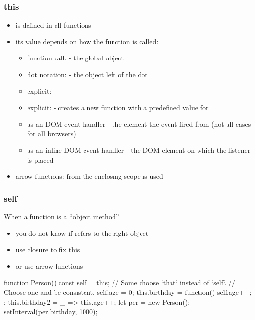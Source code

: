 \begin{frame}[fragile] \frametitle{this}
\begin{itemize}
  \item {} is defined in all functions
  \item its value depends on how the function is called:
  \begin{itemize}
    \item function call:  - the global object
    \item dot notation:  - the object left of the dot
    \item explicit: 
    \item explicit:  - creates a new function with a predefined value for 
    \item as an DOM event handler - the element the event fired from (not all cases for all browsers)
    \item as an inline DOM event handler - the DOM element on which the listener is placed
  \end{itemize}
  \item arrow functions:  from the enclosing scope is used
\end{itemize}
\end{frame}

\begin{frame}[fragile] \frametitle{self}
When a function is a ``object method''
\begin{itemize}
  \item you do not know if  refers to the right object
  \item use closure to fix this
  \item or use arrow functions
\end{itemize}
\begin{CodeBox}{}
function Person() {
  const self = this; // Some choose `that` instead of `self`. 
                           // Choose one and be consistent.
  self.age = 0;
  this.birthday = function() { self.age++; };
  this.birthday2 = _ =>  this.age++;
}
let per = new Person();
setInterval(per.birthday, 1000);
\end{CodeBox}
\end{frame}

